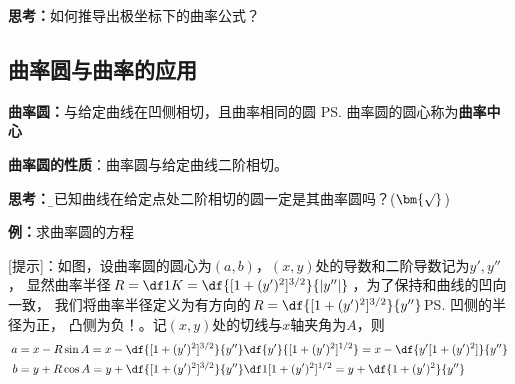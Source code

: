 {\bf 思考：}如何推导出极坐标下的曲率公式？

\subsection{曲率圆与曲率的应用}

{\bf 曲率圆：}与给定曲线在凹侧相切，且曲率相同的圆
\ps{曲率圆的圆心称为{\bf 曲率中心}}

\begin{thx}
	{\bf 曲率圆的性质}：曲率圆与给定曲线二阶相切。
\end{thx}

{\bf 思考：}{\b 与已知曲线在给定点处二阶相切的圆一定是其曲率圆吗？(${\bm{\surd}}$)}

{\bf 例：}求曲率圆的方程

\begin{center}
\end{center}

[提示]：如图，设曲率圆的圆心为$(a,b)$，$(x,y)$处的导数和二阶导数记为$y',y''$，
显然曲率半径$R=\df1K=\df{[1+(y')^2]^{3/2}}{|y''|}$，为了保持和曲线的凹向一致，
我们将曲率半径定义为有方向的$R=\df{[1+(y')^2]^{3/2}}{y''}$\ps{凹侧的半径为正，
凸侧为负！}。记$(x,y)$处的切线与$x$轴夹角为$A$，则
\begin{align}
	a&=x-R\sin A=x-\df{[1+(y')^2]^{3/2}}{y''}\df{y'}{[1+(y')^2]^{1/2}}
	=x-\df{y'[1+(y')^2]}{y''}\notag\\
	b&=y+R\cos A=y+\df{[1+(y')^2]^{3/2}}{y''}\df1{[1+(y')^2]^{1/2}}
	=y+\df{1+(y')^2}{y''}\notag
\end{align}


